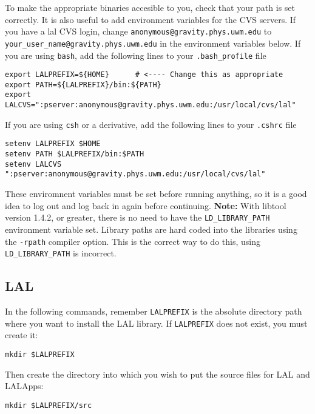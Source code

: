 To make the appropriate binaries accesible to you,  check that your path is
set correctly. It is also useful to add environment variables for the CVS
servers. If you have a lal CVS login, change
\verb+anonymous@gravity.phys.uwm.edu+ to
\verb+your_user_name@gravity.phys.uwm.edu+ in the environment variables below.
If you are using \texttt{bash}, add
the following lines to your \texttt{.bash\_profile} file
\begin{verbatim}
export LALPREFIX=${HOME}      # <---- Change this as appropriate
export PATH=${LALPREFIX}/bin:${PATH}
export LALCVS=":pserver:anonymous@gravity.phys.uwm.edu:/usr/local/cvs/lal"
\end{verbatim}
If you are using \texttt{csh} or a derivative,  add the following lines to
your \texttt{.cshrc} file
\begin{verbatim}
setenv LALPREFIX $HOME
setenv PATH $LALPREFIX/bin:$PATH
setenv LALCVS ":pserver:anonymous@gravity.phys.uwm.edu:/usr/local/cvs/lal"
\end{verbatim}
These enviromnent variables must be set before running anything,
so it is a good idea to log out and log back in again before
continuing.   \textbf{Note:} With libtool version 1.4.2, or greater, there is
no need to have the \verb+LD_LIBRARY_PATH+ environment variable set. Library
paths are hard coded into the libraries using the \texttt{-rpath}
compiler option. This is the correct way to do this,  using
\verb+LD_LIBRARY_PATH+ is incorrect.  

\color{black}
\subsection{LAL}\label{ss:lal}
\color{black}

In the following commands, remember \verb+LALPREFIX+ is the
absolute directory path where you want to install the LAL library.  If
\verb+LALPREFIX+ does not exist,  you must create it:
\begin{verbatim}
mkdir $LALPREFIX
\end{verbatim}
Then create the directory into which you wish to put the source files for LAL
and LALApps:
\begin{verbatim}
mkdir $LALPREFIX/src
\end{verbatim}

